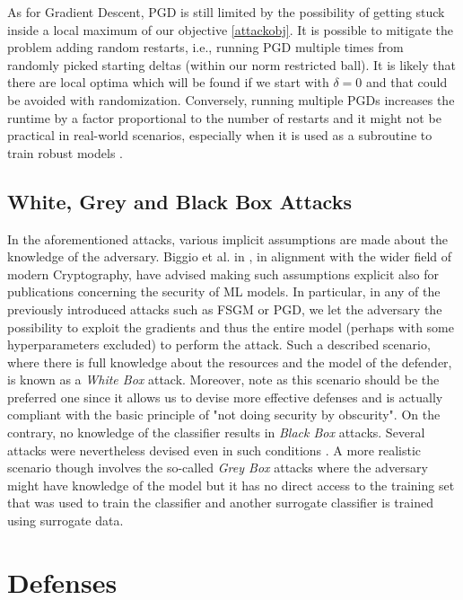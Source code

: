 \documentclass[LaM,binding=0.6cm]{./packages/sapthesis/sapthesis}
\begin{document}
        As for Gradient Descent, PGD is still limited by the possibility of getting stuck inside a local maximum of our objective \ref{attackobj}.
        It is possible to mitigate the problem adding random restarts, i.e., running PGD multiple times from randomly picked starting deltas (within our norm restricted ball).
        It is likely that there are local optima which will be found if we start with $\delta = 0$ and that could be avoided with randomization. 
        Conversely, running multiple PGDs increases the runtime by a factor proportional to the number of restarts and it might not be practical in real-world scenarios, especially when it is used
        as a subroutine to train robust models \cite{free_adv_train}.

    \subsection{White, Grey and Black Box Attacks}

        In the aforementioned attacks, various implicit assumptions are made about the knowledge of the adversary. Biggio et al. in \cite{biggio2013security},
        in alignment with the wider field of modern Cryptography, have advised making such assumptions explicit also for publications concerning the security of ML models. In particular,
        in any of the previously introduced attacks such as FSGM or PGD, we let the adversary the possibility to exploit the gradients and thus the entire model (perhaps with some hyperparameters excluded) 
        to perform the attack. Such a described scenario, where there is full knowledge about the resources and the model of the defender, is known as a \textit{White Box} attack. 
        Moreover, note as this scenario should be the preferred one since it allows us to devise more effective defenses and is actually compliant with the basic principle
        of "not doing security by obscurity".    
        On the contrary, no knowledge of the classifier results in \textit{Black Box} attacks. Several attacks were nevertheless devised even in such conditions \cite{blackbox}. A more realistic 
        scenario though involves the so-called \textit{Grey Box} attacks \cite{carliniattack1}
        where the adversary might have knowledge of the model but it has no direct access to the training set that
        was used to train the classifier and another surrogate classifier is trained using surrogate data.

        
    \section{Defenses}
        
\end{document}
